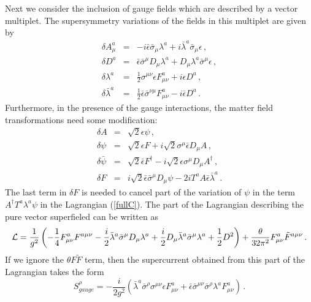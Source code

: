 Next we consider the inclusion of gauge fields which are described by
a vector multiplet. The supersymmetry variations of the fields in this
multiplet are given by 
\begin{equation}
\begin{array}{lll}
\delta A^a_\mu &=& -i\bar{\epsilon}\bar{\sigma}_\mu\lambda^a +
i \bar{\lambda}^a \bar{\sigma}_\mu\epsilon \,,\\
\delta D^{a} &=&\bar{\epsilon}\bar{\sigma}^\mu D_\mu \lambda^a +
D_\mu \lambda^{a} \bar{\sigma}^\mu \epsilon \,,\\
\delta\lambda^a &=& \frac{1}{2} \sigma^{\mu\nu}\epsilon F^a_{\mu\nu} 
+ i\epsilon D^a \,,\\
\delta\bar{\lambda}^a &=&\frac{1}{2}\bar{\epsilon}\bar{\sigma}^{\nu
\mu} F^a_{\mu\nu} - i \bar{\epsilon} D^a \,.
\end{array}
\label{str1-g}
\end{equation}
Furthermore, in the presence of the gauge interactions, the matter
field transformations need some modification: 
\begin{equation}
\begin{array}{lll}
\delta A &=& \sqrt{2} \epsilon \psi \,,\\
\delta \psi &=& \sqrt{2} \epsilon F + i \sqrt{2} \sigma^\mu
\bar{\epsilon} D_\mu A \,,\\
\delta\bar{\psi}&=&\sqrt{2}\bar{\epsilon} F^\dagger -i\sqrt{2}
\epsilon \sigma^\mu D_\mu A^\dagger \,,\\
\delta F &=& i\sqrt{2}\bar{\epsilon} \bar{\sigma}^\mu D_\mu \psi - 
2i T^a A \bar{\epsilon} \bar{\lambda}^a\,.
\end{array}
\label{str1-m}
\end{equation}
The last term in $\delta F$ is needed to cancel part of the variation
of $\psi$ in the term $A^\dagger T^a\lambda^a\psi$ in the Lagrangian
(\ref{fullC}). The part of the Lagrangian describing the pure vector
superfieled can be written as 
$$
{\cal L}=\frac{1}{g^2}\left(-\frac{1}{4} F^a_{\mu\nu} F^{a\mu\nu}-
\frac{i}{2}\bar\lambda^a\bar\sigma^\mu D_\mu\lambda^a+\frac{i}{2}
D_\mu \bar\lambda^a\bar\sigma^\mu\lambda^a+\frac{1}{2}D^{2} \right) + 
\frac{\theta}{32 \pi^2} F^a_{\mu\nu} \tilde{F}^{a\mu\nu} \,.
$$
If we ignore the $\theta F \tilde{F}$ term, then the supercurrent
obtained from this part of the Lagrangian takes the form
$$
S^\rho_{gauge}=-\frac{i}{2g^2}\left(\bar{\lambda}^a \bar{\sigma}^\rho
\sigma^{\mu\nu}\epsilon F^a_{\mu\nu}+\bar{\epsilon}\bar{\sigma}^{\mu\nu} 
\bar{\sigma}^\rho \lambda^a F^a_{\mu\nu}\right)\,.
$$
